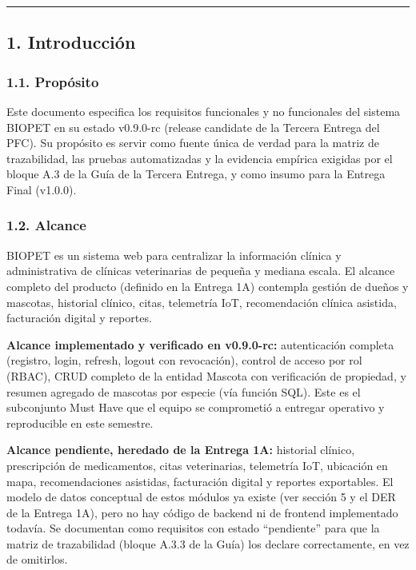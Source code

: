 \documentclass[
]{article}
\begin{document}
\begin{center}\rule{0.5\linewidth}{0.5pt}\end{center}

\hypertarget{introducciuxf3n}{%
\subsection{1. Introducción}\label{introducciuxf3n}}

\hypertarget{propuxf3sito}{%
\subsubsection{1.1. Propósito}\label{propuxf3sito}}

Este documento especifica los requisitos funcionales y no funcionales
del sistema BIOPET en su estado v0.9.0-rc (release candidate de la
Tercera Entrega del PFC). Su propósito es servir como fuente única de
verdad para la matriz de trazabilidad, las pruebas automatizadas y la
evidencia empírica exigidas por el bloque A.3 de la Guía de la Tercera
Entrega, y como insumo para la Entrega Final (v1.0.0).

\hypertarget{alcance}{%
\subsubsection{1.2. Alcance}\label{alcance}}

BIOPET es un sistema web para centralizar la información clínica y
administrativa de clínicas veterinarias de pequeña y mediana escala. El
alcance completo del producto (definido en la Entrega 1A) contempla
gestión de dueños y mascotas, historial clínico, citas, telemetría IoT,
recomendación clínica asistida, facturación digital y reportes.

\textbf{Alcance implementado y verificado en v0.9.0-rc:} autenticación
completa (registro, login, refresh, logout con revocación), control de
acceso por rol (RBAC), CRUD completo de la entidad Mascota con
verificación de propiedad, y resumen agregado de mascotas por especie
(vía función SQL). Este es el subconjunto Must Have que el equipo se
comprometió a entregar operativo y reproducible en este semestre.

\textbf{Alcance pendiente, heredado de la Entrega 1A:} historial
clínico, prescripción de medicamentos, citas veterinarias, telemetría
IoT, ubicación en mapa, recomendaciones asistidas, facturación digital y
reportes exportables. El modelo de datos conceptual de estos módulos ya
existe (ver sección 5 y el DER de la Entrega 1A), pero no hay código de
backend ni de frontend implementado todavía. Se documentan como
requisitos con estado ``pendiente'' para que la matriz de trazabilidad
(bloque A.3.3 de la Guía) los declare correctamente, en vez de
omitirlos.
\end{document}
